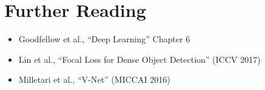 \section{Further Reading}

\begin{itemize}
    \item Goodfellow et al., ``Deep Learning'' Chapter 6
    \item Lin et al., ``Focal Loss for Dense Object Detection'' (ICCV 2017)
    \item Milletari et al., ``V-Net'' (MICCAI 2016)
\end{itemize}
